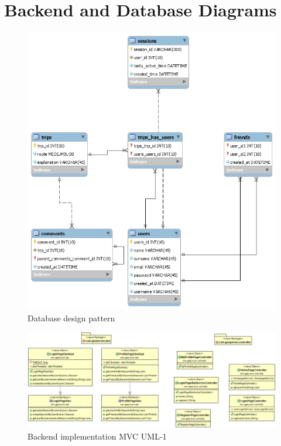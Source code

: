 \newpage 
\section{Backend and Database Diagrams}

\begin{figure}[!htbp]
\centering
\includegraphics[width=\textwidth]{projectChapters/images/databaseDesign.png}
\caption{Database design pattern}
\end{figure}
 
 
\begin{figure}[!htbp]
\centering
\includegraphics[width=\textwidth]{projectChapters/images/backend1.png}
\caption{Backend implementation MVC UML-1}
\end{figure}

